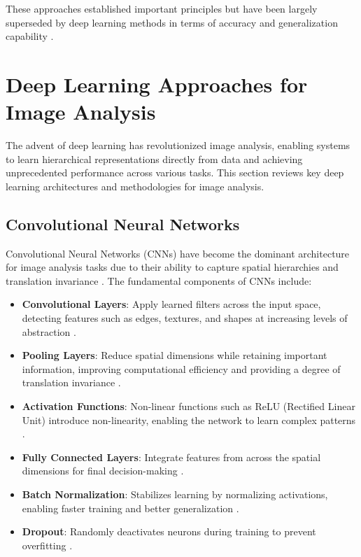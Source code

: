 These approaches established important principles but have been largely superseded by deep learning methods in terms of accuracy and generalization capability \cite{zhao2019object}.

\section{Deep Learning Approaches for Image Analysis}
The advent of deep learning has revolutionized image analysis, enabling systems to learn hierarchical representations directly from data and achieving unprecedented performance across various tasks. This section reviews key deep learning architectures and methodologies for image analysis.

\subsection{Convolutional Neural Networks}
Convolutional Neural Networks (CNNs) have become the dominant architecture for image analysis tasks due to their ability to capture spatial hierarchies and translation invariance \cite{krizhevsky2012imagenet}. The fundamental components of CNNs include:

\begin{itemize}
    \item \textbf{Convolutional Layers}: Apply learned filters across the input space, detecting features such as edges, textures, and shapes at increasing levels of abstraction \cite{lecun1998gradient}.
    
    \item \textbf{Pooling Layers}: Reduce spatial dimensions while retaining important information, improving computational efficiency and providing a degree of translation invariance \cite{boureau2010theoretical}.
    
    \item \textbf{Activation Functions}: Non-linear functions such as ReLU (Rectified Linear Unit) introduce non-linearity, enabling the network to learn complex patterns \cite{nair2010rectified}.
    
    \item \textbf{Fully Connected Layers}: Integrate features from across the spatial dimensions for final decision-making \cite{lecun1998gradient}.
    
    \item \textbf{Batch Normalization}: Stabilizes learning by normalizing activations, enabling faster training and better generalization \cite{ioffe2015batch}.
    
    \item \textbf{Dropout}: Randomly deactivates neurons during training to prevent overfitting \cite{srivastava2014dropout}.
\end{itemize}

